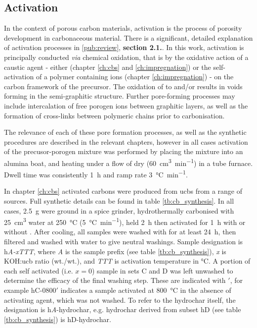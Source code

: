 \subsection{Activation}
In the context of porous carbon materials, activation is the process of porosity development in carbonaceous material.\citep{Sevilla2014Energy} There is a significant, detailed explanation of activation processes in \ref{pub:review}, \textbf{section 2.1.}. In this work, activation is principally conducted \textit{via} chemical oxidation,\citep{Sevilla2014Energy} that is by the oxidative action of a caustic agent - either  (chapter \ref{ch:cbs} and \ref{ch:impregnation}) or the self-activation of a polymer containing  ions (chapter \ref{ch:impregnation}) - on the carbon framework of the precursor. The oxidation of  to  and/or  results in voids forming in the semi-graphitic structure.\citep{Wang2009High, Wang2012, Otowa1993Production} Further pore-forming processes may include intercalation of free \gls{porogen} ions between graphitic layers,\citep{LozanoCastello2007Carbon} as well as the formation of cross-links between polymeric chains prior to carbonisation.\citep{lin2015preparation, yu2017koh, yu2017one}

The relevance of each of these pore formation processes, as well as the synthetic procedures are described in the relevant chapters, however in all cases activation of the precusor-\gls{porogen} mixture was performed by placing the mixture into an alumina boat, and heating under a flow of dry  (\qty{60}{\cm\cubed\per\minute}) in a tube furnace. Dwell time was consistently \qty{1}{\hour} and ramp rate \qty{3}{\degreeCelsius\per\minute}.

In chapter \ref{ch:cbs} activated carbons were produced from \glspl{ucb} from a range of sources. Full synthetic details can be found in table \ref{tb:cb_synthesis}. In all cases, \qty{2.5}{\gram}  were ground in a spice grinder, hydrothermally carbonised with \qty{25}{\cm\cubed} water at \qty{250}{\degreeCelsius} (\qty{5}{\degreeCelsius\per\minute}), held \qty{2}{\hour} then activated for \qty{1}{\hour} with or without . After cooling, all samples were washed with  for at least \qty{24}{\hour}, then filtered and washed with water to give neutral washings. Sample designation is h\textit{A-xTTT}, where \textit{A} is the sample prefix (see table \ref{tb:cb_synthesis}), \textit{x} is KOH:\acrshort{ucb} ratio (wt./wt.), and \textit{TTT} is activation temperature in \unit{\degreeCelsius}. A portion of each self activated (i.e. $x = 0$) sample in sets C and D was left unwashed to determine the efficacy of the final washing step. These are indicated with $'$, for example hC-0800$'$ indicates a sample activated at \qty{800}{\degreeCelsius} in the absence of \gls{activating agent}, which was not washed. To refer to the \gls{hydrochar} itself, the designation is h\textit{A}-hydrochar, e.g. \gls{hydrochar} derived from subset hD (see table \ref{tb:cb_synthesis}) is hD-hydrochar.

